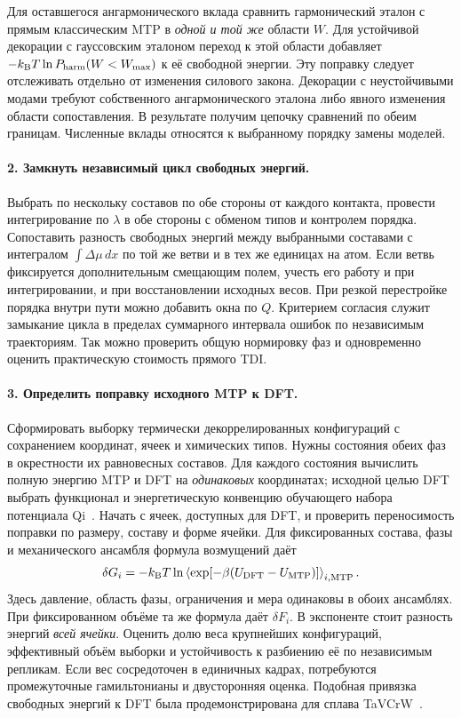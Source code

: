 \documentclass[11pt,a4paper]{article}
\begin{document}
Для оставшегося ангармонического вклада сравнить гармонический эталон
с прямым классическим MTP в \emph{одной и той же} области \(W\).
Для устойчивой декорации с гауссовским эталоном переход к этой области
добавляет \(-k_{\rm B}T\ln P_{\rm harm}(W<W_{\max})\) к её свободной
энергии. Эту поправку следует отслеживать отдельно от изменения силового
закона. Декорации с неустойчивыми модами требуют собственного
ангармонического эталона либо явного изменения области сопоставления.
В результате получим цепочку сравнений по обеим границам. Численные
вклады относятся к выбранному порядку замены моделей.

\paragraph{2. Замкнуть независимый цикл свободных энергий.}
Выбрать по нескольку составов по обе стороны от каждого контакта, провести
интегрирование по \(\lambda\) в обе стороны с обменом типов и контролем
порядка. Сопоставить разность свободных энергий между выбранными составами
с интегралом \(\int\Delta\mu\,dx\) по той же ветви и в тех же единицах
на атом. Если ветвь фиксируется дополнительным смещающим полем, учесть
его работу и при интегрировании, и при восстановлении исходных весов.
При резкой перестройке порядка внутри пути можно добавить окна по \(Q\).
Критерием согласия служит замыкание цикла в пределах суммарного интервала
ошибок по независимым траекториям. Так можно проверить общую нормировку
фаз и одновременно оценить практическую стоимость прямого TDI.

\paragraph{3. Определить поправку исходного MTP к DFT.}
Сформировать выборку термически декоррелированных конфигураций с сохранением
координат, ячеек и химических типов. Нужны состояния обеих фаз в окрестности
их равновесных составов. Для каждого состояния вычислить полную энергию
MTP и DFT на \emph{одинаковых} координатах; исходной целью DFT выбрать
функционал и энергетическую конвенцию обучающего набора потенциала
Qi~\cite{qi2023}. Начать с ячеек, доступных для DFT, и проверить
переносимость поправки по размеру, составу и форме ячейки. Для фиксированных
состава, фазы и механического ансамбля формула возмущений даёт
\[
 \delta G_i=-k_{\rm B}T
   \ln\left\langle \exp[-\beta(U_{\rm DFT}-U_{\rm MTP})]\right\rangle_{i,{\rm MTP}} .
\]
Здесь давление, область фазы, ограничения и мера одинаковы в обоих
ансамблях. При фиксированном объёме та же формула даёт \(\delta F_i\).
В экспоненте стоит разность энергий \emph{всей ячейки}. Оценить долю
веса крупнейших конфигураций, эффективный объём выборки и устойчивость
к разбиению её по независимым репликам. Если вес сосредоточен в
единичных кадрах, потребуются промежуточные гамильтонианы и
двусторонняя оценка. Подобная привязка свободных энергий к DFT была
продемонстрирована для сплава TaVCrW~\cite{zhu2024}.
\end{document}
